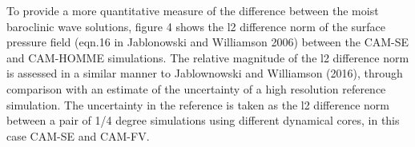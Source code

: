 {\color{red}{Show results for wave evolution and L2 error norms}}
To provide a more quantitative measure of the difference between the moist baroclinic wave solutions, figure 4 shows the l2 difference norm of the surface pressure field (eqn.16 in Jablonowski and Williamson 2006) between the CAM-SE and CAM-HOMME simulations. The relative magnitude of the l2 difference norm is assessed in a similar manner to Jablownowski and Williamson (2016), through comparison with an estimate of the uncertainty of a high resolution reference simulation. The uncertainty in the reference is taken as the l2 difference norm between a pair of 1/4 degree simulations using different dynamical cores, in this case CAM-SE and CAM-FV.
